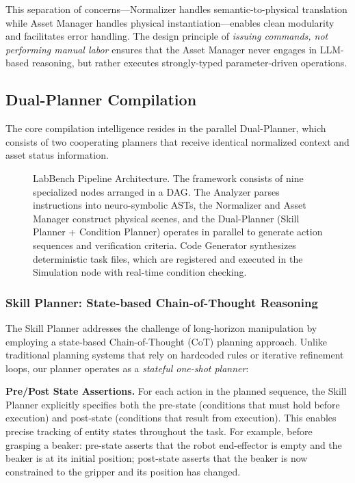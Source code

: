 \documentclass[letterpaper]{article} %
\begin{document}
This separation of concerns---Normalizer handles semantic-to-physical translation while Asset Manager handles physical instantiation---enables clean modularity and facilitates error handling. The design principle of \textit{issuing commands, not performing manual labor} ensures that the Asset Manager never engages in LLM-based reasoning, but rather executes strongly-typed parameter-driven operations.

\subsection{Dual-Planner Compilation}

The core compilation intelligence resides in the parallel Dual-Planner, which consists of two cooperating planners that receive identical normalized context and asset status information.

\begin{figure}[t]
\centering
\caption{LabBench Pipeline Architecture. The framework consists of nine specialized nodes arranged in a DAG. The Analyzer parses instructions into neuro-symbolic ASTs, the Normalizer and Asset Manager construct physical scenes, and the Dual-Planner (Skill Planner + Condition Planner) operates in parallel to generate action sequences and verification criteria. Code Generator synthesizes deterministic task files, which are registered and executed in the Simulation node with real-time condition checking.}
\label{fig:framework_overview}
\end{figure}

\subsubsection{Skill Planner: State-based Chain-of-Thought Reasoning}

The Skill Planner addresses the challenge of long-horizon manipulation by employing a state-based Chain-of-Thought (CoT) planning approach. Unlike traditional planning systems that rely on hardcoded rules or iterative refinement loops, our planner operates as a \textit{stateful one-shot planner}:

\textbf{Pre/Post State Assertions.} For each action in the planned sequence, the Skill Planner explicitly specifies both the pre-state (conditions that must hold before execution) and post-state (conditions that result from execution). This enables precise tracking of entity states throughout the task. For example, before grasping a beaker: pre-state asserts that the robot end-effector is empty and the beaker is at its initial position; post-state asserts that the beaker is now constrained to the gripper and its position has changed.
\end{document}
